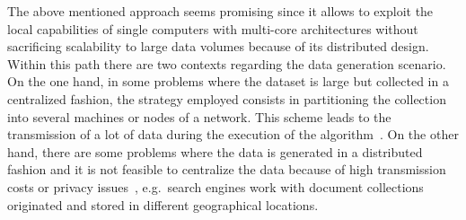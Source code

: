 \documentclass[10pt]{article}
\begin{document}
The above mentioned approach seems promising since it allows to exploit the local capabilities of single computers with multi-core architectures without sacrificing scalability to large data volumes because of its distributed design. Within this path there are two contexts regarding the data generation scenario. 
On the one hand, in some problems where the dataset is large but collected in a centralized fashion, the strategy employed consists in partitioning the collection into several machines or nodes of a network. 
This scheme leads to the transmission of a lot of data during the execution of the algorithm~\citep{N15}. On the other hand, there are some problems where the data is generated in a distributed fashion and it is not feasible to centralize the data because of high transmission costs or privacy issues~\citep{JW05,LHLX12}, e.g.\  search engines  work with document collections originated and stored in different geographical locations.
\end{document}
